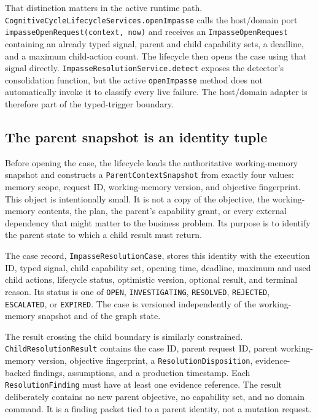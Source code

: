 That distinction matters in the active runtime path. \texttt{Cognitive\allowbreak Cycle\allowbreak Lifecycle\allowbreak Services.\allowbreak open\allowbreak Impasse} calls the host/domain port \texttt{impasse\allowbreak Open\allowbreak Request(context, now)} and receives an \texttt{Impasse\allowbreak Open\allowbreak Request} containing an already typed signal, parent and child capability sets, a deadline, and a maximum child-action count. The lifecycle then opens the case using that signal directly. \texttt{Impasse\allowbreak Resolution\allowbreak Service.\allowbreak detect} exposes the detector's consolidation function, but the active \texttt{openImpasse} method does not automatically invoke it to classify every live failure. The host/domain adapter is therefore part of the typed-trigger boundary.

\subsection{The parent snapshot is an identity tuple}
\label{subsec:ch22-parent-snapshot}

Before opening the case, the lifecycle loads the authoritative working-memory snapshot and constructs a \texttt{Parent\allowbreak Context\allowbreak Snapshot} from exactly four values: memory scope, request ID, working-memory version, and objective fingerprint. This object is intentionally small. It is not a copy of the objective, the working-memory contents, the plan, the parent's capability grant, or every external dependency that might matter to the business problem. Its purpose is to identify the parent state to which a child result must return.

The case record, \texttt{Impasse\allowbreak Resolution\allowbreak Case}, stores this identity with the execution ID, typed signal, child capability set, opening time, deadline, maximum and used child actions, lifecycle status, optimistic version, optional result, and terminal reason. Its status is one of \texttt{OPEN}, \texttt{INVESTIGATING}, \texttt{RESOLVED}, \texttt{REJECTED}, \texttt{ESCALATED}, or \texttt{EXPIRED}. The case is versioned independently of the working-memory snapshot and of the graph state.

The result crossing the child boundary is similarly constrained. \texttt{Child\allowbreak Resolution\allowbreak Result} contains the case ID, parent request ID, parent working-memory version, objective fingerprint, a \texttt{Resolution\allowbreak Disposition}, evidence-backed findings, assumptions, and a production timestamp. Each \texttt{Resolution\allowbreak Finding} must have at least one evidence reference. The result deliberately contains no new parent objective, no capability set, and no domain command. It is a finding packet tied to a parent identity, not a mutation request.

